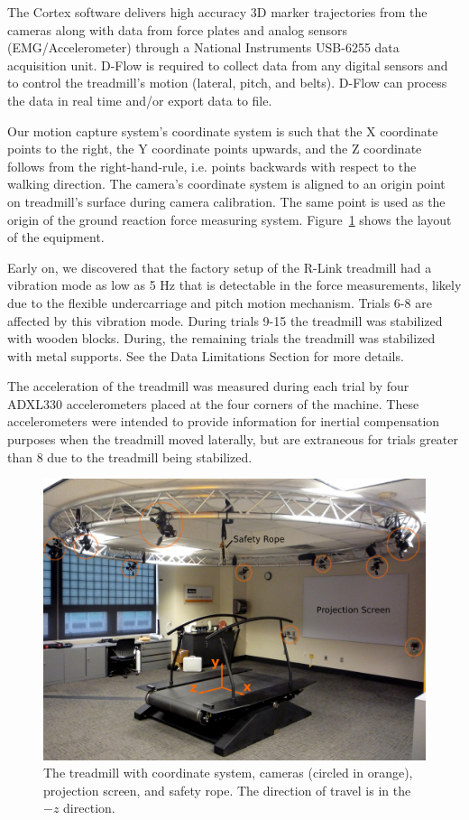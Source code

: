 \documentclass[fleqn,10pt]{wlpeerj}
\begin{document}
The Cortex software delivers high accuracy 3D marker trajectories from the
cameras along with data from force plates and analog sensors
(EMG/Accelerometer) through a National Instruments USB-6255 data acquisition
unit. D-Flow is required to collect data from any digital sensors and to
control the treadmill's motion (lateral, pitch, and belts). D-Flow can process
the data in real time and/or export data to file.

Our motion capture system's coordinate system is such that the X coordinate
points to the right, the Y coordinate points upwards, and the Z coordinate
follows from the right-hand-rule, i.e. points backwards with respect to the
walking direction. The camera's coordinate system is aligned to an origin point
on treadmill's surface during camera calibration. The same point is used as the
origin of the ground reaction force measuring system.
Figure~\ref{fig:treadmill} shows the layout of the equipment.

Early on, we discovered that the factory setup of the R-Link treadmill had a
vibration mode as low as 5 Hz that is detectable in the force measurements,
likely due to the flexible undercarriage and pitch motion mechanism. Trials 6-8
are affected by this vibration mode. During trials 9-15 the treadmill was
stabilized with wooden blocks. During, the remaining trials the treadmill was
stabilized with metal supports. See the Data Limitations Section for more
details.

The acceleration of the treadmill was measured during each trial by four
ADXL330 accelerometers placed at the four corners of the machine. These
accelerometers were intended to provide information for inertial compensation
purposes when the treadmill moved laterally, but are extraneous for trials
greater than 8 due to the treadmill being stabilized.
%
\begin{figure}
  \centering
  \includegraphics{figures/treadmill.png}
  \caption{The treadmill with coordinate system, cameras (circled in orange),
    projection screen, and safety rope. The direction of travel is in the $-z$
    direction.}
  \label{fig:treadmill}
\end{figure}
\end{document}
